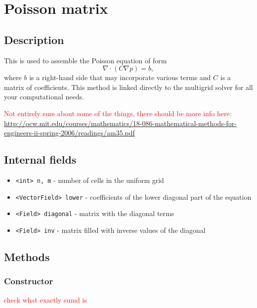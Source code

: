 \documentclass[notitlepage]{article}
\begin{document}
\section{Poisson matrix}

\subsection{Description}

This is used to assemble the Poisson equation of form
%
\begin{equation}\label{eq:PoissonLHS}
\nabla \cdot (C \nabla p) = b ,
\end{equation}
%
where $b$ is a right-hand side that may incorporate various terms and $C$ is a matrix of coefficients.
This method is linked directly to the multigrid solver for all your computational needs.

\textcolor{red}{Not entirely sure about some of the things, there should be more info here:
\url{http://ocw.mit.edu/courses/mathematics/18-086-mathematical-methods-for-engineers-ii-spring-2006/readings/am35.pdf}}

\subsection{Internal fields}

\begin{itemize}
\item \texttt{<int> n, m} - number of cells in the uniform grid
\item \texttt{<VectorField> lower} - coefficients of the lower diagonal part of the equation
\item \texttt{<Field> diagonal} - matrix with the diagonal terms
\item \texttt{<Field> inv} - matrix filled with inverse values of the diagonal
\end{itemize}

\subsection{Methods}

\subsubsection{Constructor}

\textcolor{red}{check what exactly sumd is}
\end{document}
